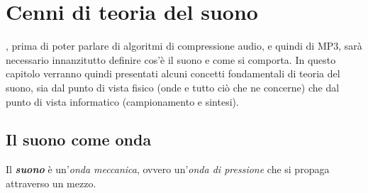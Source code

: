 \chapter{Cenni di teoria del suono} \label{chap:teoria_suono}
	
	, prima di poter parlare di algoritmi di compressione audio, e quindi di MP3, sarà necessario innanzitutto definire cos'è il suono e come si comporta. In questo capitolo verranno quindi presentati alcuni concetti fondamentali di teoria del suono, sia dal punto di vista fisico (onde e tutto ciò che ne concerne) che dal punto di vista informatico (campionamento e sintesi).
	
	\section{Il suono come onda} \label{sec:suono_onda}
		
		\begin{defi} \label{defi:suono}
			Il \emph{\textbf{suono}} è un'\emph{onda meccanica}, ovvero un'\emph{onda di pressione} che si propaga attraverso un mezzo.
		\end{defi}
		
